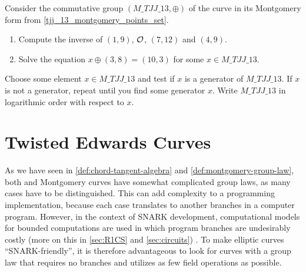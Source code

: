 \begin{exercise}
Consider the commutative group $(\mathit{M\_TJJ\_13},\oplus)$ of the  curve in its Montgomery form from \examplename{} \eqref{tjj_13_montgomery_points_set}. 
\begin{enumerate}
\item Compute the inverse of $(1,9)$, $\mathcal{O}$, $(7,12)$ and $(4,9)$.
\item Solve the equation $x \oplus (3,8) = (10,3) $ for some $x\in \mathit{M\_TJJ\_13}$.
\end{enumerate}
Choose some element $x\in \mathit{M\_TJJ\_13}$ and test if $x$ is a generator of $\mathit{M\_TJJ\_13}$. If $x$ is not a generator, repeat until you find some generator $x$. Write $\mathit{M\_TJJ\_13}$ in logarithmic order with respect to $x$.
\end{exercise}

\section{Twisted Edwards Curves}\label{sec:edwards}
As we have seen in  \ref{def:chord-tangent-algebra} and  \ref{def:montgomery-group-law}, both  and Montgomery curves have somewhat complicated group laws, as many cases have to be distinguished. This can add complexity to a programming implementation, because each case translates to another branches in a computer program. However, in the context of SNARK development, computational models for bounded computations are used in which program branches are undesirably costly (more on this in \secname{} \ref{sec:R1CS} and \ref{sec:circuits}) .  To make elliptic curves ``SNARK-friendly'', it is therefore advantageous to look for curves with a group law that requires no branches and utilizes as few field operations as possible.


